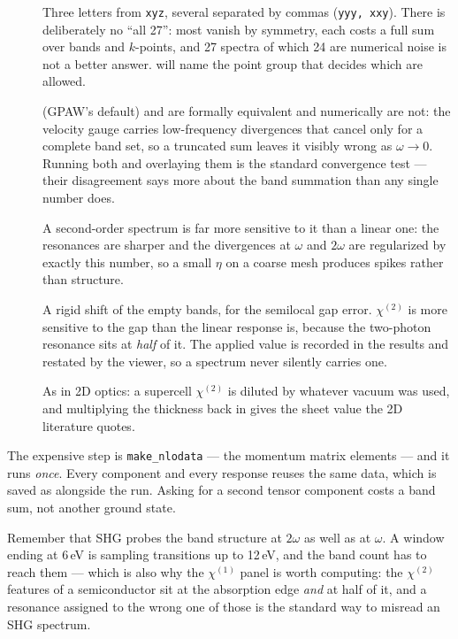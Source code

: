 \begin{description}
  \item[] Three letters from \texttt{xyz}, several
    separated by commas (\texttt{yyy, xxy}). There is deliberately no
    ``all 27'': most vanish by symmetry, each costs a full sum over bands and
    $k$-points, and 27 spectra of which 24 are numerical noise is not a better
    answer. \menusep{} will name the point group
    that decides which are allowed.
  \item[]  (GPAW's default) and  are
    formally equivalent and numerically are not: the velocity gauge carries
    low-frequency divergences that cancel only for a complete band set, so a
    truncated sum leaves it visibly wrong as $\omega \to 0$. Running both and
    overlaying them is the standard convergence test --- their disagreement
    says more about the band summation than any single number does.
  \item[] A second-order spectrum is far more sensitive
    to it than a linear one: the resonances are sharper and the divergences at
    $\omega$ and $2\omega$ are regularized by exactly this number, so a small
    $\eta$ on a coarse mesh produces spikes rather than structure.
  \item[] A rigid shift of the empty bands, for the
    semilocal gap error. $\chi^{(2)}$ is more sensitive to the gap than the
    linear response is, because the two-photon resonance sits at \emph{half} of
    it. The applied value is recorded in the results and restated by the
    viewer, so a spectrum never silently carries one.
  \item[] As in 2D optics: a supercell $\chi^{(2)}$ is diluted
    by whatever vacuum was used, and multiplying the thickness back in gives
    the sheet value the 2D literature quotes.
\end{description}

\begin{calnote}
The expensive step is \texttt{make\_nlodata} --- the momentum matrix elements
--- and it runs \emph{once}. Every component and every response reuses the same
data, which is saved as  alongside the run. Asking for a second
tensor component costs a band sum, not another ground state.
\end{calnote}

\begin{caltip}
Remember that SHG probes the band structure at $2\omega$ as well as at
$\omega$. A window ending at 6\,eV is sampling transitions up to 12\,eV, and
the band count has to reach them --- which is also why the $\chi^{(1)}$ panel
is worth computing: the $\chi^{(2)}$ features of a semiconductor sit at the
absorption edge \emph{and} at half of it, and a resonance assigned to the wrong
one of those is the standard way to misread an SHG spectrum.
\end{caltip}

